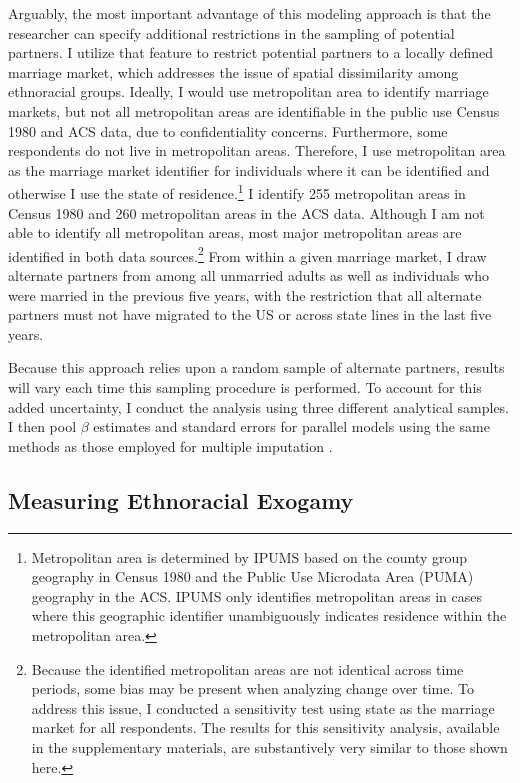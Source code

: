\documentclass[11pt,]{article}
\begin{document}
Arguably, the most important advantage of this modeling approach is that the researcher can specify additional restrictions in the sampling of potential partners. I utilize that feature to restrict potential partners to a locally defined marriage market, which addresses the issue of spatial dissimilarity among ethnoracial groups. Ideally, I would use metropolitan area to identify marriage markets, but not all metropolitan areas are identifiable in the public use Census 1980 and ACS data, due to confidentiality concerns. Furthermore, some respondents do not live in metropolitan areas. Therefore, I use metropolitan area as the marriage market identifier for individuals where it can be identified and otherwise I use the state of residence.\footnote{Metropolitan area is determined by IPUMS based on the county group geography in Census 1980 and the Public Use Microdata Area (PUMA) geography in the ACS. IPUMS only identifies metropolitan areas in cases where this geographic identifier unambiguously indicates residence within the metropolitan area.} I identify 255 metropolitan areas in Census 1980 and 260 metropolitan areas in the ACS data. Although I am not able to identify all metropolitan areas, most major metropolitan areas are identified in both data sources.\footnote{Because the identified metropolitan areas are not identical across time periods, some bias may be present when analyzing change over time. To address this issue, I conducted a sensitivity test using state as the marriage market for all respondents. The results for this sensitivity analysis, available in the supplementary materials, are substantively very similar to those shown here.} From within a given marriage market, I draw alternate partners from among all unmarried adults as well as individuals who were married in the previous five years, with the restriction that all alternate partners must not have migrated to the US or across state lines in the last five years.

Because this approach relies upon a random sample of alternate partners, results will vary each time this sampling procedure is performed. To account for this added uncertainty, I conduct the analysis using three different analytical samples. I then pool \(\beta\) estimates and standard errors for parallel models using the same methods as those employed for multiple imputation \citep{rubin_multiple_1987, gullickson_counterfactual_2021}.

\hypertarget{measuring-ethnoracial-exogamy}{%
\subsection{Measuring Ethnoracial Exogamy}\label{measuring-ethnoracial-exogamy}}
\end{document}
